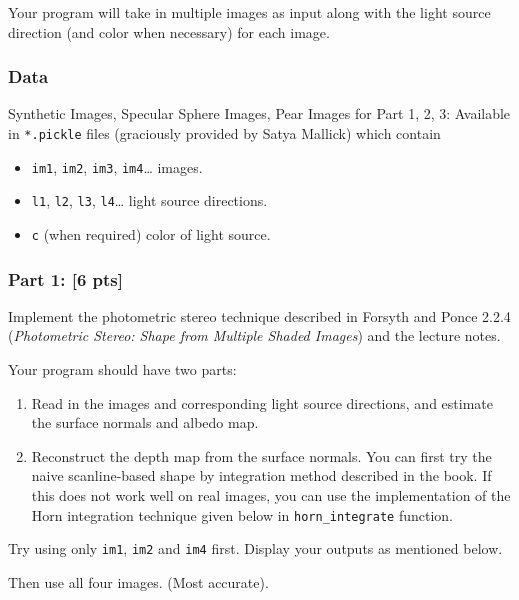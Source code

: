 \documentclass[11pt]{article}
\begin{document}
Your program will take in multiple images as input along with the light
source direction (and color when necessary) for each image.

\hypertarget{data}{%
\subsubsection{Data}\label{data}}

Synthetic Images, Specular Sphere Images, Pear Images for Part 1, 2, 3:
Available in \texttt{*.pickle} files (graciously provided by Satya
Mallick) which contain

\begin{itemize}
\item
  \texttt{im1}, \texttt{im2}, \texttt{im3}, \texttt{im4}\ldots{} images.
\item
  \texttt{l1}, \texttt{l2}, \texttt{l3}, \texttt{l4}\ldots{} light
  source directions.
\item
  \texttt{c} (when required) color of light source.
\end{itemize}

    \hypertarget{part-1-6-pts}{%
\subsubsection{Part 1: {[}6 pts{]}}\label{part-1-6-pts}}

Implement the photometric stereo technique described in Forsyth and
Ponce 2.2.4 (\emph{Photometric Stereo: Shape from Multiple Shaded
Images}) and the lecture notes.

Your program should have two parts:

\begin{enumerate}
\def\labelenumi{\arabic{enumi}.}
\item
  Read in the images and corresponding light source directions, and
  estimate the surface normals and albedo map.
\item
  Reconstruct the depth map from the surface normals. You can first try
  the naive scanline-based shape by integration method described in the
  book. If this does not work well on real images, you can use the
  implementation of the Horn integration technique given below in
  \texttt{horn\_integrate} function.
\end{enumerate}

Try using only \texttt{im1}, \texttt{im2} and \texttt{im4} first.
Display your outputs as mentioned below.

Then use all four images. (Most accurate).
\end{document}
